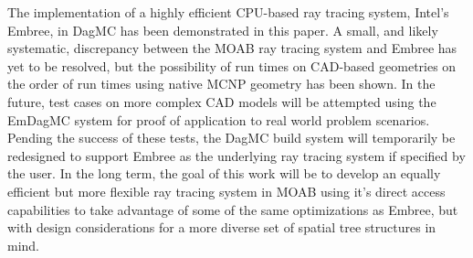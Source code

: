 \documentclass{anstrans}
\begin{document}
The implementation of a highly efficient CPU-based ray tracing system, Intel's Embree, in DagMC has been demonstrated in this paper. A small, and likely systematic, discrepancy between the MOAB ray tracing system and Embree has yet to be resolved, but the possibility of run times on CAD-based geometries on the order of run times using native MCNP geometry has been shown.
In the future, test cases on more complex CAD models will be attempted using the EmDagMC system for proof of application to real world problem scenarios. Pending the success of these tests, the DagMC build system will temporarily be redesigned to support Embree as the underlying ray tracing system if specified by the user. In the long term, the goal of this work will be to develop an equally efficient but more flexible ray tracing system in MOAB using it's direct access capabilities to take advantage of some of the same optimizations as Embree, but with design considerations for a more diverse set of spatial tree structures in mind. 

\vspace{-0.2cm}


\end{document}
